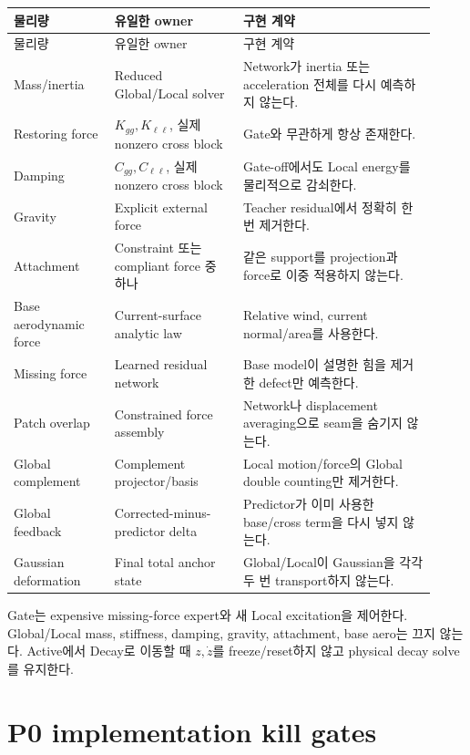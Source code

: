 \documentclass[10pt,a4paper]{article}
\begin{document}
\begin{longtable}{L{0.22\linewidth}L{0.28\linewidth}L{0.42\linewidth}}
\toprule
물리량 & 유일한 owner & 구현 계약 \\
\midrule
\endfirsthead
\toprule
물리량 & 유일한 owner & 구현 계약 \\
\midrule
\endhead
Mass/inertia & Reduced Global/Local solver & Network가 inertia 또는 acceleration 전체를 다시 예측하지 않는다. \\
Restoring force & \(K_{gg},K_{\ell\ell}\), 실제 nonzero cross block & Gate와 무관하게 항상 존재한다. \\
Damping & \(C_{gg},C_{\ell\ell}\), 실제 nonzero cross block & Gate-off에서도 Local energy를 물리적으로 감쇠한다. \\
Gravity & Explicit external force & Teacher residual에서 정확히 한 번 제거한다. \\
Attachment & Constraint 또는 compliant force 중 하나 & 같은 support를 projection과 force로 이중 적용하지 않는다. \\
Base aerodynamic force & Current-surface analytic law & Relative wind, current normal/area를 사용한다. \\
Missing force & Learned residual network & Base model이 설명한 힘을 제거한 defect만 예측한다. \\
Patch overlap & Constrained force assembly & Network나 displacement averaging으로 seam을 숨기지 않는다. \\
Global complement & Complement projector/basis & Local motion/force의 Global double counting만 제거한다. \\
Global feedback & Corrected-minus-predictor delta & Predictor가 이미 사용한 base/cross term을 다시 넣지 않는다. \\
Gaussian deformation & Final total anchor state & Global/Local이 Gaussian을 각각 두 번 transport하지 않는다. \\
\bottomrule
\end{longtable}

\begin{tcolorbox}[colback=LightOrange,colframe=orange!60!black,title=Gate가 끄는 것과 끄지 않는 것,fonttitle=\bfseries]
Gate는 expensive missing-force expert와 새 Local excitation을 제어한다.
Global/Local mass, stiffness, damping, gravity, attachment, base aero는 끄지 않는다.
Active에서 Decay로 이동할 때 \(z,\dot z\)를 freeze/reset하지 않고 physical decay solve를 유지한다.
\end{tcolorbox}

\section{P0 implementation kill gates}
\end{document}
